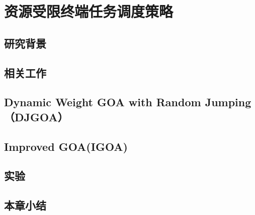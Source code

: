 \chapter{资源受限终端任务调度策略}\label{chap:task_scheduling}

\section{研究背景}

\section{相关工作}

\section{Dynamic Weight GOA with Random Jumping（DJGOA）}

\section{Improved GOA(IGOA)}

\section{实验}

\section{本章小结}